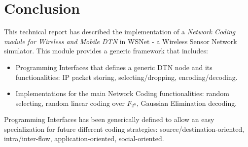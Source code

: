 \documentclass[a4paper,twoside]{article}
\begin{document}
\newpage

\section{Conclusion}

This technical report has described the implementation of a \emph{Network Coding module for Wireless and Mobile DTN} in WSNet - a Wireless Sensor Network simulator. This module provides a generic framework that includes: 
\begin{itemize}
\item Programming Interfaces that defines a generic DTN node and its functionalities: IP packet storing, selecting/dropping, encoding/decoding.
\item Implementations for the main Network Coding functionalities: random selecting, random linear coding over $F_{2^n}$, Gaussian Elimination decoding.
\end{itemize}
Programming Interfaces has been generically defined to allow an easy specialization for future different coding strategies: source/destination-oriented, intra/inter-flow, application-oriented, social-oriented.

\newpage



\end{document}
